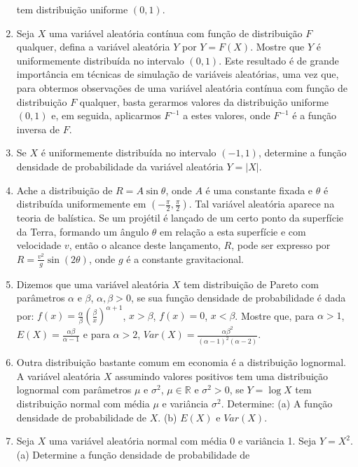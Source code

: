 \documentclass[
  10pt,
]{article}
\begin{document}
\begin{enumerate}
  tem distribuição uniforme \((0, 1)\).
\item
  Seja \(X\) uma variável aleatória contínua com função de distribuição
  \(F\) qualquer, defina a variável aleatória \(Y\) por \(Y = F(X)\).
  Mostre que \(Y\) é uniformemente distribuída no intervalo \((0, 1)\).
  Este resultado é de grande importância em técnicas de simulação de
  variáveis aleatórias, uma vez que, para obtermos observações de uma
  variável aleatória contínua com função de distribuição \(F\) qualquer,
  basta gerarmos valores da distribuição uniforme \((0, 1)\) e, em
  seguida, aplicarmos \(F^{-1}\) a estes valores, onde \(F^{-1}\) é a
  função inversa de \(F\).
\item
  Se \(X\) é uniformemente distribuída no intervalo \((-1, 1)\),
  determine a função densidade de probabilidade da variável aleatória
  \(Y = |X|\).
\item
  Ache a distribuição de \(R = A\sin\theta\), onde \(A\) é uma constante
  fixada e \(\theta\) é distribuída uniformemente em
  \((-\frac{\pi}{2}, \frac{\pi}{2})\). Tal variável aleatória aparece na
  teoria de balística. Se um projétil é lançado de um certo ponto da
  superfície da Terra, formando um ângulo \(\theta\) em relação a esta
  superfície e com velocidade \(v\), então o alcance deste lançamento,
  \(R\), pode ser expresso por \(R = \frac{v^2}{g}\sin(2\theta)\), onde
  \(g\) é a constante gravitacional.
\item
  Dizemos que uma variável aleatória \(X\) tem distribuição de Pareto
  com parâmetros \(\alpha\) e \(\beta\), \(\alpha, \beta > 0\), se sua
  função densidade de probabilidade é dada por:
  \(f(x) = \frac{\alpha}{\beta}(\frac{\beta}{x})^{\alpha+1}\),
  \(x > \beta\), \(f(x) = 0\), \(x < \beta\). Mostre que, para
  \(\alpha > 1\), \(E(X) = \frac{\alpha\beta}{\alpha-1}\) e para
  \(\alpha > 2\),
  \(Var(X) = \frac{\alpha\beta^2}{(\alpha-1)^2(\alpha-2)}\).
\item
  Outra distribuição bastante comum em economia é a distribuição
  lognormal. A variável aleatória \(X\) assumindo valores positivos tem
  uma distribuição lognormal com parâmetros \(\mu\) e \(\sigma^2\),
  \(\mu \in \mathbb{R}\) e \(\sigma^2 > 0\), se \(Y = \log X\) tem
  distribuição normal com média \(\mu\) e variância \(\sigma^2\).
  Determine: (a) A função densidade de probabilidade de \(X\). (b)
  \(E(X)\) e \(Var(X)\).
\item
  Seja \(X\) uma variável aleatória normal com média 0 e variância 1.
  Seja \(Y = X^2\). (a) Determine a função densidade de probabilidade de

\end{enumerate}
\end{document}
